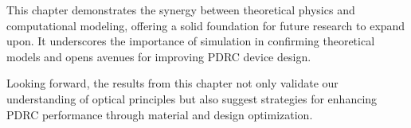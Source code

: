 This chapter demonstrates the synergy between theoretical physics and computational modeling, offering a solid foundation for future research to expand upon. It underscores the importance of simulation in confirming theoretical models and opens avenues for improving PDRC device design.

Looking forward, the results from this chapter not only validate our understanding of optical principles but also suggest strategies for enhancing PDRC performance through material and design optimization.